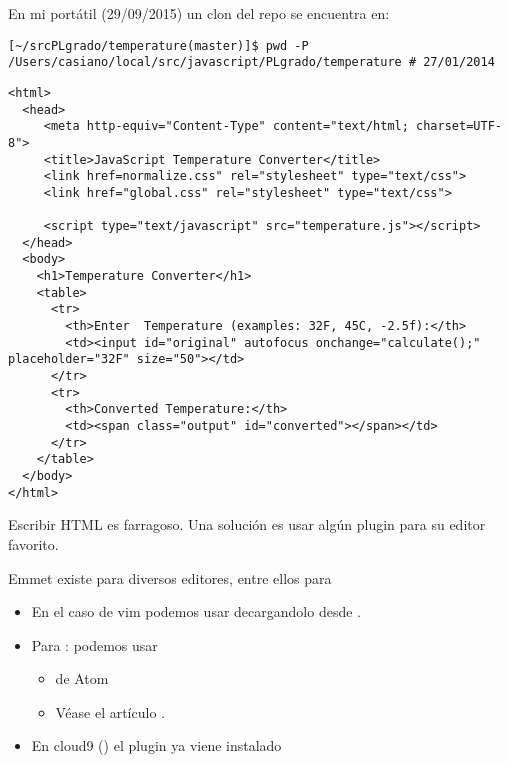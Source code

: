 En mi portátil (29/09/2015) un clon del repo se encuentra en:
\begin{verbatim}
[~/srcPLgrado/temperature(master)]$ pwd -P
/Users/casiano/local/src/javascript/PLgrado/temperature # 27/01/2014
\end{verbatim}


    \begin{verbatim}
<html>
  <head>
     <meta http-equiv="Content-Type" content="text/html; charset=UTF-8">
     <title>JavaScript Temperature Converter</title>
     <link href=normalize.css" rel="stylesheet" type="text/css">
     <link href="global.css" rel="stylesheet" type="text/css">

     <script type="text/javascript" src="temperature.js"></script>
  </head>
  <body>
    <h1>Temperature Converter</h1>
    <table>
      <tr>
        <th>Enter  Temperature (examples: 32F, 45C, -2.5f):</th>
        <td><input id="original" autofocus onchange="calculate();" placeholder="32F" size="50"></td>
      </tr>
      <tr>
        <th>Converted Temperature:</th>
        <td><span class="output" id="converted"></span></td>
      </tr>
    </table>
  </body>
</html>
    \end{verbatim}


  Escribir HTML es farragoso. Una solución es usar algún plugin para su editor favorito.

Emmet existe para diversos editores, entre ellos para 
\begin{itemize}
\item
  En el caso de vim podemos usar 
decargandolo desde 
.

\item
Para :
podemos usar
\begin{itemize}
\item
{} de Atom
\item
Véase el artículo .
\end{itemize}
\item
En
cloud9 
()
el plugin ya viene instalado
\end{itemize}


